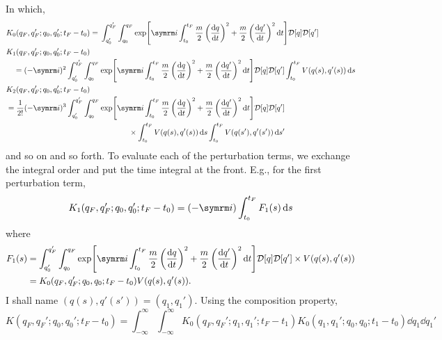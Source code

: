 In which,
\begin{align}
    &K_0(q_F, q_F'; q_0, q_0'; t_F - t_0) = \begin{multlined}
        \int_{q_0'}^{q_F'}\int_{q_0}^{q_F}\exp[\im\int_{t_0}^{t_F}\frac{m}{2}\left(\dv{q}{t}\right)^2 + \frac{m}{2}\left(\dv{q'}{t}\right)^2\dd{t}]\pintm{q}\pintm{q'}
    \end{multlined} \\
    &\begin{multlined}
        K_1(q_F, q_F'; q_0, q_0'; t_F - t_0) \\= (-\im)^2\int_{q_0'}^{q_F'}\int_{q_0}^{q_F}\exp[\im\int_{t_0}^{t_F}\frac{m}{2}\left(\dv{q}{t}\right)^2 + \frac{m}{2}\left(\dv{q'}{t}\right)^2\dd{t}]\pintm{q}\pintm{q'}\int_{t_0}^{t_F}V(q(s), q'(s))\dd{s}
    \end{multlined} \\
    &\begin{multlined}
        K_2(q_F, q_F'; q_0, q_0'; t_F - t_0) \\= \frac{1}{2!}(-\im)^3\int_{q_0'}^{q_F'}\int_{q_0}^{q_F}\exp[\im\int_{t_0}^{t_F}\frac{m}{2}\left(\dv{q}{t}\right)^2 + \frac{m}{2}\left(\dv{q'}{t}\right)^2\dd{t}]\pintm{q}\pintm{q'} \\
        \times \int_{t_0}^{t_F}V(q(s), q'(s))\dd{s}\int_{t_0}^{t_F}V(q(s'), q'(s'))\dd{s'}
    \end{multlined}
\end{align}
and so on and so forth. To evaluate each of the perturbation terms, we exchange the integral order and put the time integral at the front. E.g., for the first perturbation term,
\begin{equation}
    K_1(q_F, q_F'; q_0, q_0'; t_F - t_0) = (-\im)\int_{t_0}^{t_F}F_1(s)\dd{s}
\end{equation}
where
\begin{align}
    F_1(s) &= \int_{q_0'}^{q_F'}\int_{q_0}^{q_F}\exp[\im\int_{t_0}^{t_F}\frac{m}{2}\left(\dv{q}{t}\right)^2 + \frac{m}{2}\left(\dv{q'}{t}\right)^2\dd{t}]\pintm{q}\pintm{q'} \times V(q(s), q'(s)) \\
    &=  K_0(q_F, q_F'; q_0, q_0; t_F - t_0)V(q(s), q'(s)).
\end{align}
I shall name $(q(s), q'(s')) = (q_1, q_1')$. Using the composition property,
\begin{equation}
    K(q_F, q_F'; q_0, q_0'; t_F - t_0) = \int_{-\infty}^{\infty}\int_{-\infty}^{\infty}K_0(q_F, q_F'; q_1, q_1'; t_F - t_1)K_0(q_1, q_1'; q_0, q_0; t_1 - t_0)\dd{q_1}\dd{q_1'}
\end{equation}
